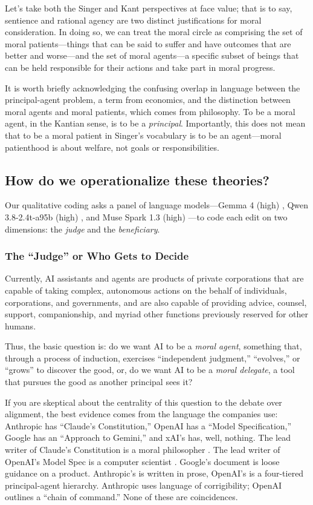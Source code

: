 \documentclass[letterpaper]{article} %
\begin{document}
Let's take both the Singer and Kant perspectives at face value; that is to say, sentience and rational agency are two distinct justifications for moral consideration. In doing so, we can treat the moral circle as comprising the set of moral patients---things that can be said to suffer and have outcomes that are better and worse---and the set of moral agents---a specific subset of beings that can be held responsible for their actions and take part in moral progress.

It is worth briefly acknowledging the confusing overlap in language between the principal-agent problem, a term from economics, and the distinction between moral agents and moral patients, which comes from philosophy. To be a moral agent, in the Kantian sense, is to be a \emph{principal}. Importantly, this does not mean that to be a moral patient in Singer's vocabulary is to be an agent---moral patienthood is about welfare, not goals or responsibilities.

\subsection{How do we operationalize these theories?}

Our qualitative coding asks a panel of language models---Gemma 4 (high) \citep{or_gemma4}, Qwen 3.8-2.4t-a95b (high) \citep{or_qwen38}, and Muse Spark 1.3 (high) \citep{or_musespark13}---to code each edit on two dimensions: the \emph{judge} and the \emph{beneficiary}.

\subsubsection{The ``Judge'' or Who Gets to Decide}

Currently, AI assistants and agents are products of private corporations that are capable of taking complex, autonomous actions on the behalf of individuals, corporations, and governments, and are also capable of providing advice, counsel, support, companionship, and myriad other functions previously reserved for other humans.

Thus, the basic question is: do we want AI to be a \emph{moral agent}, something that, through a process of induction, exercises ``independent judgment,'' ``evolves,'' or ``grows'' to discover the good, or, do we want AI to be a \emph{moral delegate}, a tool that pursues the good as another principal sees it?

If you are skeptical about the centrality of this question to the debate over alignment, the best evidence comes from the language the companies use: Anthropic has ``Claude's Constitution,'' \citep{anthropic_constitution} OpenAI has a ``Model Specification,'' \citep{openai_modelspec} Google has an ``Approach to Gemini,'' \citep{google_approach} and xAI's has, well, nothing. The lead writer of Claude's Constitution is a moral philosopher \citep{askell_site}. The lead writer of OpenAI's Model Spec is a computer scientist \citep{barak_site}. Google's document is loose guidance on a product. Anthropic's is written in prose, OpenAI's is a four-tiered principal-agent hierarchy. Anthropic uses language of corrigibility; OpenAI outlines a ``chain of command.'' None of these are coincidences.
\end{document}
